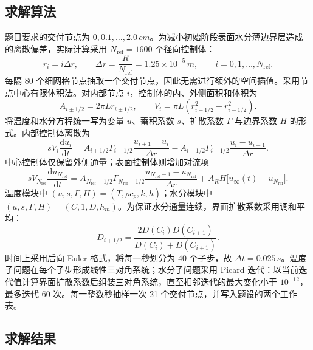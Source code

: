 \documentclass[withoutpreface,bwprint]{cumcmthesis}
\begin{document}
\subsection{求解算法}

题目要求的交付节点为 $0,0.1,\ldots,2.0\,\si{cm}$。为减小初始阶段表面水分薄边界层造成的离散偏差，实际计算采用 $N_{\mathrm{ref}}=1600$ 个径向控制体：
\begin{equation}
r_i=i\Delta r,\qquad \Delta r=\frac{R}{N_{\mathrm{ref}}}
=1.25\times10^{-5}\,\si{m},
\qquad i=0,1,\ldots,N_{\mathrm{ref}}.
\label{eq:grid}
\end{equation}
每隔 $80$ 个细网格节点抽取一个交付节点，因此无需进行额外的空间插值。采用节点中心有限体积法。对内部节点 $i$，控制体的内、外侧面积和体积为
\begin{equation}
A_{i\pm1/2}=2\pi Lr_{i\pm1/2},\qquad
V_i=\pi L\left(r_{i+1/2}^2-r_{i-1/2}^2\right).
\label{eq:control_volume}
\end{equation}
将温度和水分方程统一写为变量 $u$、蓄积系数 $s$、扩散系数 $\Gamma$ 与边界系数 $H$ 的形式。内部控制体离散为
\begin{equation}
sV_i\frac{\mathrm du_i}{\mathrm dt}
=A_{i+1/2}\Gamma_{i+1/2}\frac{u_{i+1}-u_i}{\Delta r}
-A_{i-1/2}\Gamma_{i-1/2}\frac{u_i-u_{i-1}}{\Delta r}.
\label{eq:fv_internal}
\end{equation}
中心控制体仅保留外侧通量；表面控制体则增加对流项
\begin{equation}
sV_{N_{\mathrm{ref}}}\frac{\mathrm du_{N_{\mathrm{ref}}}}{\mathrm dt}
=A_{N_{\mathrm{ref}}-1/2}\Gamma_{N_{\mathrm{ref}}-1/2}
\frac{u_{N_{\mathrm{ref}}-1}-u_{N_{\mathrm{ref}}}}{\Delta r}
+A_RH\bigl[u_\infty(t)-u_{N_{\mathrm{ref}}}\bigr].
\label{eq:fv_surface}
\end{equation}
温度模块中 $(u,s,\Gamma,H)=(T,\rho c_p,k,h)$；水分模块中 $(u,s,\Gamma,H)=(C,1,D,h_m)$。为保证水分通量连续，界面扩散系数采用调和平均：
\begin{equation}
D_{i+1/2}=\frac{2D(C_i)D(C_{i+1})}{D(C_i)+D(C_{i+1})}.
\label{eq:harmonic_mean}
\end{equation}
时间上采用后向 Euler 格式，将每一秒划分为 $40$ 个子步，故 $\Delta t=0.025\,\si{s}$。温度子问题在每个子步形成线性三对角系统；水分子问题采用 Picard 迭代：以当前迭代值计算界面扩散系数后组装三对角系统，直至相邻迭代的最大变化小于 $10^{-12}$，最多迭代 $60$ 次。每一整数秒抽样一次 21 个交付节点，并写入题设的两个工作表。

\subsection{求解结果}
\end{document}
